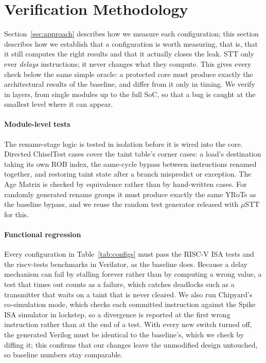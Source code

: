 \section{Verification Methodology}
\label{sec:verification}


Section~\ref{sec:approach} describes how we measure each configuration; this
section describes how we establish that a configuration is worth measuring,
that is, that it still computes the right results and that it actually closes
the leak. STT only ever \emph{delays} instructions; it never changes what they
compute. This gives every check below the same simple oracle: a protected core
must produce exactly the architectural results of the baseline, and differ
from it only in timing. We verify in layers, from single modules up to the
full SoC, so that a bug is caught at the smallest level where it can appear.

\paragraph{Module-level tests}
The rename-stage logic is tested in isolation before it is wired into the core.
Directed ChiselTest cases cover the taint table's corner cases: a load's
destination taking its own ROB index, the same-cycle bypass between
instructions renamed together, and restoring taint state after a branch
mispredict or exception. The Age Matrix is checked by equivalence rather than
by hand-written cases. For randomly generated rename groups it must produce
exactly the same YRoTs as the baseline bypass, and we reuse the random test
generator released with $\mu$STT~\cite{Chen:uSTT:2025} for this.

\paragraph{Functional regression}
Every configuration in Table~\ref{tab:configs} must pass the RISC-V ISA tests
and the riscv-tests benchmarks in Verilator, as the baseline does. Because a
delay mechanism can fail by stalling forever rather than by computing a wrong
value, a test that times out counts as a failure, which catches deadlocks
such as a transmitter that waits on a taint that is never cleared. We also run
Chipyard's co-simulation mode, which checks each committed instruction
against the Spike ISA simulator in lockstep, so a divergence is reported at
the first wrong instruction rather than at the end of a test. With every new
switch turned off, the generated Verilog must be identical to the baseline's,
which we check by diffing it; this confirms that our changes leave the
unmodified design untouched, so baseline numbers stay comparable.

